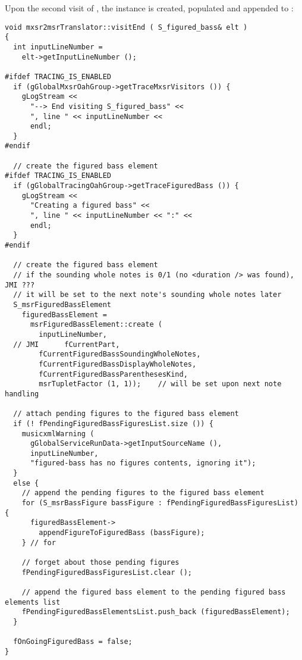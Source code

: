 Upon the second visit of , the  instance is created, populated and appended to :
\begin{lstlisting}[language=CPlusPlus]
void mxsr2msrTranslator::visitEnd ( S_figured_bass& elt )
{
  int inputLineNumber =
    elt->getInputLineNumber ();

#ifdef TRACING_IS_ENABLED
  if (gGlobalMxsrOahGroup->getTraceMxsrVisitors ()) {
    gLogStream <<
      "--> End visiting S_figured_bass" <<
      ", line " << inputLineNumber <<
      endl;
  }
#endif

  // create the figured bass element
#ifdef TRACING_IS_ENABLED
  if (gGlobalTracingOahGroup->getTraceFiguredBass ()) {
    gLogStream <<
      "Creating a figured bass" <<
      ", line " << inputLineNumber << ":" <<
      endl;
  }
#endif

  // create the figured bass element
  // if the sounding whole notes is 0/1 (no <duration /> was found), JMI ???
  // it will be set to the next note's sounding whole notes later
  S_msrFiguredBassElement
    figuredBassElement =
      msrFiguredBassElement::create (
        inputLineNumber,
  // JMI      fCurrentPart,
        fCurrentFiguredBassSoundingWholeNotes,
        fCurrentFiguredBassDisplayWholeNotes,
        fCurrentFiguredBassParenthesesKind,
        msrTupletFactor (1, 1));    // will be set upon next note handling

  // attach pending figures to the figured bass element
  if (! fPendingFiguredBassFiguresList.size ()) {
    musicxmlWarning (
      gGlobalServiceRunData->getInputSourceName (),
      inputLineNumber,
      "figured-bass has no figures contents, ignoring it");
  }
  else {
    // append the pending figures to the figured bass element
    for (S_msrBassFigure bassFigure : fPendingFiguredBassFiguresList) {
      figuredBassElement->
        appendFigureToFiguredBass (bassFigure);
    } // for

    // forget about those pending figures
    fPendingFiguredBassFiguresList.clear ();

    // append the figured bass element to the pending figured bass elements list
    fPendingFiguredBassElementsList.push_back (figuredBassElement);
  }

  fOnGoingFiguredBass = false;
}
\end{lstlisting}


